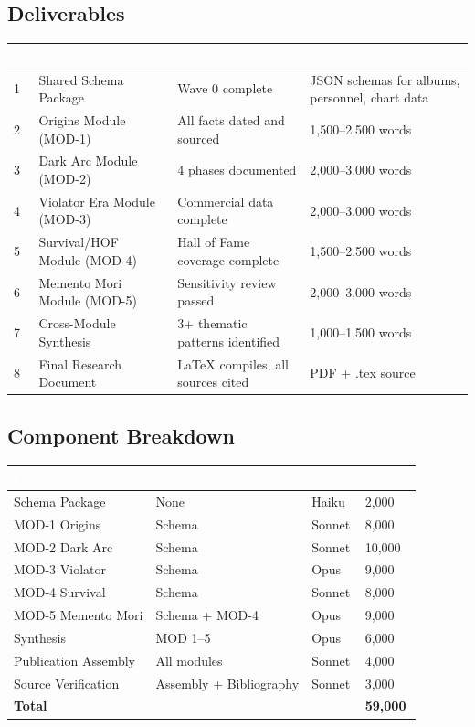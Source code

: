 \documentclass[11pt,letterpaper]{article}
\newcommand{\tableheader}[1]{\textbf{\sffamily\textcolor{white}{#1}}}
\begin{document}
\subsection{Deliverables}

\begin{center}
\begin{tabularx}{\textwidth}{C{0.5cm}L{3.5cm}L{3cm}X}
\toprule
{}
\tableheader{\#} & \tableheader{Deliverable} & \tableheader{Criteria} & \tableheader{Spec} \\
 & Shared Schema Package & Wave 0 complete & JSON schemas for albums, personnel, chart data \\
2 & Origins Module (MOD-1) & All facts dated and sourced & 1,500--2,500 words \\
3 & Dark Arc Module (MOD-2) & 4 phases documented & 2,000--3,000 words \\
4 & Violator Era Module (MOD-3) & Commercial data complete & 2,000--3,000 words \\
5 & Survival/HOF Module (MOD-4) & Hall of Fame coverage complete & 1,500--2,500 words \\
6 & Memento Mori Module (MOD-5) & Sensitivity review passed & 2,000--3,000 words \\
7 & Cross-Module Synthesis & 3+ thematic patterns identified & 1,000--1,500 words \\
8 & Final Research Document & LaTeX compiles, all sources cited & PDF + .tex source \\
\bottomrule
\end{tabularx}
\end{center}

\subsection{Component Breakdown}

\begin{center}
\begin{tabularx}{\textwidth}{L{3cm}L{2.5cm}C{1.5cm}C{1.5cm}}
\toprule
{}
\tableheader{Component} & \tableheader{Dependencies} & \tableheader{Model} & \tableheader{Tokens} \\
\midrule
Schema Package & None & Haiku & 2,000 \\
MOD-1 Origins & Schema & Sonnet & 8,000 \\
MOD-2 Dark Arc & Schema & Sonnet & 10,000 \\
MOD-3 Violator & Schema & Opus & 9,000 \\
MOD-4 Survival & Schema & Sonnet & 8,000 \\
MOD-5 Memento Mori & Schema + MOD-4 & Opus & 9,000 \\
Synthesis & MOD 1--5 & Opus & 6,000 \\
Publication Assembly & All modules & Sonnet & 4,000 \\
Source Verification & Assembly + Bibliography & Sonnet & 3,000 \\
\midrule
\textbf{Total} & & & \textbf{59,000} \\
\bottomrule
\end{tabularx}
\end{center}
\end{document}
